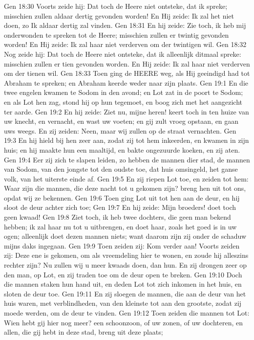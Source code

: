 Gen 18:30  Voorts zeide hij: Dat toch de Heere niet ontsteke, dat ik spreke; misschien zullen aldaar dertig gevonden worden! En Hij zeide: Ik zal het niet doen, zo Ik aldaar dertig zal vinden.
Gen 18:31  En hij zeide: Zie toch, ik heb mij onderwonden te spreken tot de Heere; misschien zullen er twintig gevonden worden! En Hij zeide: Ik zal haar niet verderven om der twintigen wil.
Gen 18:32  Nog zeide hij: Dat toch de Heere niet ontsteke, dat ik alleenlijk ditmaal spreke: misschien zullen er tien gevonden worden. En Hij zeide: Ik zal haar niet verderven om der tienen wil.
Gen 18:33  Toen ging de HEERE weg, als Hij geeindigd had tot Abraham te spreken; en Abraham keerde weder naar zijn plaats.
Gen 19:1  En die twee engelen kwamen te Sodom in den avond; en Lot zat in de poort te Sodom; en als Lot hen zag, stond hij op hun tegemoet, en boog zich met het aangezicht ter aarde.
Gen 19:2  En hij zeide: Ziet nu, mijne heren! keert toch in ten huize van uw knecht, en vernacht, en wast uw voeten; en gij zult vroeg opstaan, en gaan uws weegs. En zij zeiden: Neen, maar wij zullen op de straat vernachten.
Gen 19:3  En hij hield bij hen zeer aan, zodat zij tot hem inkeerden, en kwamen in zijn huis; en hij maakte hun een maaltijd, en bakte ongezuurde koeken, en zij aten.
Gen 19:4  Eer zij zich te slapen leiden, zo hebben de mannen dier stad, de mannen van Sodom, van den jongste tot den oudste toe, dat huis omsingeld, het ganse volk, van het uiterste einde af.
Gen 19:5  En zij riepen Lot toe, en zeiden tot hem: Waar zijn die mannen, die deze nacht tot u gekomen zijn? breng hen uit tot ons, opdat wij ze bekennen.
Gen 19:6  Toen ging Lot uit tot hen aan de deur, en hij sloot de deur achter zich toe;
Gen 19:7  En hij zeide: Mijn broeders! doet toch geen kwaad!
Gen 19:8  Ziet toch, ik heb twee dochters, die geen man bekend hebben; ik zal haar nu tot u uitbrengen, en doet haar, zoals het goed is in uw ogen; alleenlijk doet dezen mannen niets; want daarom zijn zij onder de schaduw mijns daks ingegaan.
Gen 19:9  Toen zeiden zij: Kom verder aan! Voorts zeiden zij: Deze ene is gekomen, om als vreemdeling hier te wonen, en zoude hij alleszins rechter zijn? Nu zullen wij u meer kwaads doen, dan hun. En zij drongen zeer op den man, op Lot, en zij traden toe om de deur open te breken.
Gen 19:10  Doch die mannen staken hun hand uit, en deden Lot tot zich inkomen in het huis, en sloten de deur toe.
Gen 19:11  En zij sloegen de mannen, die aan de deur van het huis waren, met verblindheden, van den kleinste tot aan den grootste, zodat zij moede werden, om de deur te vinden.
Gen 19:12  Toen zeiden die mannen tot Lot: Wien hebt gij hier nog meer? een schoonzoon, of uw zonen, of uw dochteren, en allen, die gij hebt in deze stad, breng uit deze plaats;
